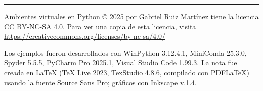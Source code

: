 \documentclass{article}
\begin{document}
	\nocite{anaconda2025}
	\nocite{python2025}
	\nocite{pythont2025}
	\nocite{rohowsky2023}
	\nocite{vsc2025}
	\nocite{mayer2012}
	
	
	
	
	
	\vspace{0.5cm}
	\hrule 
	\vspace{0.25cm}
	{\footnotesize Ambientes virtuales en Python © 2025 por Gabriel Ruiz Martínez tiene la licencia CC BY-NC-SA 4.0. Para ver una copia de esta licencia, visita  \url{https://creativecommons.org/licenses/by-nc-sa/4.0/}\bigskip
	
	Los ejemplos fueron desarrollados con WinPython 3.12.4.1, MiniConda 25.3.0, Spyder 5.5.5, PyCharm Pro 2025.1, Visual Studio Code 1.99.3. La nota fue creada en \LaTeX{} (TeX Live 2023, TexStudio 4.8.6, compilado con PDFLaTeX) usando la fuente Source Sans Pro; gráficos con Inkscape v.1.4.}
	
\end{document}
